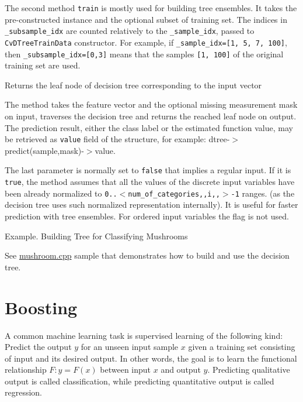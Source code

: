 The second method \texttt{train} is mostly used for building tree ensembles. It takes the pre-constructed  instance and the optional subset of training set. The indices in \texttt{\_subsample\_idx} are counted relatively to the \texttt{\_sample\_idx}, passed to \texttt{CvDTreeTrainData} constructor. For example, if \texttt{\_sample\_idx=[1, 5, 7, 100]}, then \texttt{\_subsample\_idx=[0,3]} means that the samples \texttt{[1, 100]} of the original training set are used.



Returns the leaf node of decision tree corresponding to the input vector


The method takes the feature vector and the optional missing measurement mask on input, traverses the decision tree and returns the reached leaf node on output. The prediction result, either the class label or the estimated function value, may be retrieved as \texttt{value} field of the  structure, for example: dtree-$>$predict(sample,mask)-$>$value.

The last parameter is normally set to \texttt{false} that implies a regular input. If it is \texttt{true}, the method assumes that all the values of the discrete input variables have been already normalized to \texttt{0..$<$num\_of\_categories,,i,,$>$-1} ranges. (as the decision tree uses such normalized representation internally). It is useful for faster prediction with tree ensembles. For ordered input variables the flag is not used.

Example. Building Tree for Classifying Mushrooms

See \href{../../samples/c/mushroom.cpp}{mushroom.cpp} sample that demonstrates how to build and use the decision tree.

\section{Boosting} %

A common machine learning task is supervised learning of the following kind: Predict the output $y$ for an unseen input sample $x$ given a training set consisting of input and its desired output. In other words, the goal is to learn the functional relationship $F: y = F(x)$ between input $x$ and output $y$. Predicting qualitative output is called classification, while predicting quantitative output is called regression.

